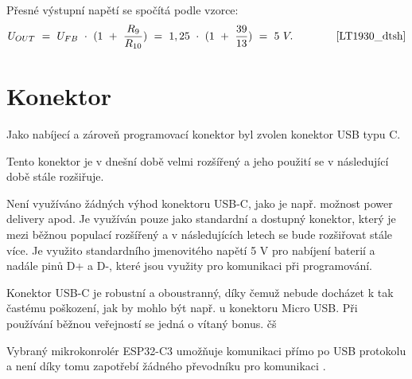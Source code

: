 Přesné výstupní napětí se spočítá podle vzorce:
\begin{equation} 
  U_{OUT}~=~U_{FB}~\cdot~(1~+~\frac{R_{9}}{R_{10}})~=~1,25~\cdot~(1~+~\frac{39}{13})~=~5~V. 
  \quad \quad \quad \quad \cite{LT1930_dtsh}
\label{eq:VOUT_LT1930}
\end{equation}



\section{Konektor}
Jako nabíjecí a zároveň programovací konektor byl zvolen konektor USB typu C.

Tento konektor je v dnešní době velmi rozšířený a jeho použití se v následující době stále rozšiřuje. 

Není využíváno žádných výhod konektoru USB-C, jako je např. možnost power delivery apod. Je využíván pouze jako standardní a dostupný konektor, který je mezi běžnou
populací rozšířený a v následujících letech se bude rozšiřovat stále více. Je využito standardního jmenovitého napětí 5 V pro nabíjení baterií a nadále pinů D+ a D-, 
které jsou využity pro komunikaci při programování. 

Konektor USB-C je robustní a oboustranný, díky čemuž nebude docházet k tak častému poškození, jak by mohlo být např. u konektoru Micro USB. Při používání běžnou veřejností
se jedná o vítaný bonus. čš

Vybraný mikrokonrolér ESP32-C3 umožňuje komunikaci přímo po USB protokolu a není díky tomu zapotřebí žádného převodníku pro komunikaci \cite{ESP_C3_dtsh}. %





